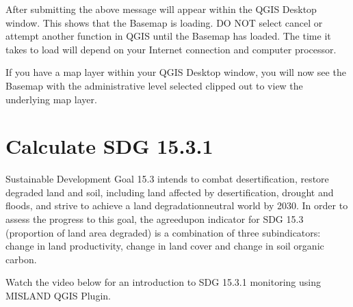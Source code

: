 \documentclass[letterpaper,10pt,english]{sphinxmanual}
\begin{document}
\sphinxAtStartPar
After submitting the above message will appear within the QGIS Desktop window. This shows that the Basemap is loading. DO NOT select cancel or attempt another function in QGIS until the Basemap has loaded. The time it takes to load will depend on your Internet connection and computer processor.

\sphinxAtStartPar
If you have a map layer within your QGIS Desktop window, you will now see the Basemap with the administrative level selected clipped out to view the underlying map layer.

\sphinxstepscope


\chapter{Calculate SDG 15.3.1}
\label{\detokenize{Qgis_Plugin/sdg_15_training:calculate-sdg-15-3-1}}\label{\detokenize{Qgis_Plugin/sdg_15_training::doc}}

\sphinxAtStartPar
Sustainable Development Goal 15.3 intends to combat desertification, restore
degraded land and soil, including land affected by desertification, drought and
floods, and strive to achieve a land degradation\sphinxhyphen{}neutral world by 2030. In
order to assess the progress to this goal, the agreed\sphinxhyphen{}upon indicator for SDG
15.3 (proportion of land area degraded) is a combination of three
sub\sphinxhyphen{}indicators: change in land productivity, change in land cover and change
in soil organic carbon.

\sphinxAtStartPar
Watch the video below for an introduction to SDG 15.3.1 monitoring using MISLAND
QGIS Plugin.



\sphinxstepscope
\end{document}
